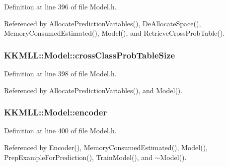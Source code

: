 Definition at line 396 of file Model.\+h.



Referenced by Allocate\+Prediction\+Variables(), De\+Allocate\+Space(), Memory\+Consumed\+Estimated(), Model(), and Retrieve\+Cross\+Prob\+Table().

\subsubsection[{\texorpdfstring{cross\+Class\+Prob\+Table\+Size}{crossClassProbTableSize}}]{ K\+K\+M\+L\+L\+::\+Model\+::cross\+Class\+Prob\+Table\+Size\hspace{0.3cm}{\ttfamily [protected]}}\hypertarget{class_k_k_m_l_l_1_1_model_a6e6436028d45da095f732b4bf7835101}{}\label{class_k_k_m_l_l_1_1_model_a6e6436028d45da095f732b4bf7835101}


Definition at line 398 of file Model.\+h.



Referenced by Allocate\+Prediction\+Variables(), and Model().

\subsubsection[{\texorpdfstring{encoder}{encoder}}]{ K\+K\+M\+L\+L\+::\+Model\+::encoder\hspace{0.3cm}{\ttfamily [protected]}}\hypertarget{class_k_k_m_l_l_1_1_model_afd3a7d6f769fd7d818ed4f8a8d6479b3}{}\label{class_k_k_m_l_l_1_1_model_afd3a7d6f769fd7d818ed4f8a8d6479b3}


Definition at line 400 of file Model.\+h.



Referenced by Encoder(), Memory\+Consumed\+Estimated(), Model(), Prep\+Example\+For\+Prediction(), Train\+Model(), and $\sim$\+Model().

